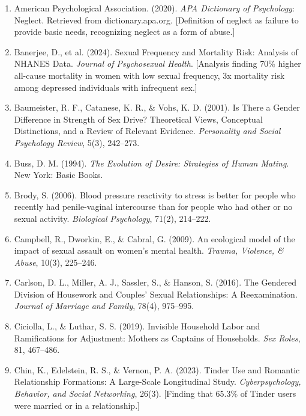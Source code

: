 \documentclass[12pt,openany]{book}
\numberwithin{equation}{chapter}
\begin{document}
\begin{enumerate}
    \item American Psychological Association. (2020). \textit{APA Dictionary of Psychology}: Neglect. Retrieved from dictionary.apa.org. [Definition of neglect as failure to provide basic needs, recognizing neglect as a form of abuse.]
    
    \item Banerjee, D., et al. (2024). Sexual Frequency and Mortality Risk: Analysis of NHANES Data. \textit{Journal of Psychosexual Health}. [Analysis finding 70\% higher all-cause mortality in women with low sexual frequency, 3x mortality risk among depressed individuals with infrequent sex.]
    
    \item Baumeister, R. F., Catanese, K. R., \& Vohs, K. D. (2001). Is There a Gender Difference in Strength of Sex Drive? Theoretical Views, Conceptual Distinctions, and a Review of Relevant Evidence. \textit{Personality and Social Psychology Review}, 5(3), 242--273.
    
    \item Buss, D. M. (1994). \textit{The Evolution of Desire: Strategies of Human Mating}. New York: Basic Books.
    
    \item Brody, S. (2006). Blood pressure reactivity to stress is better for people who recently had penile-vaginal intercourse than for people who had other or no sexual activity. \textit{Biological Psychology}, 71(2), 214--222.
    
    \item Campbell, R., Dworkin, E., \& Cabral, G. (2009). An ecological model of the impact of sexual assault on women's mental health. \textit{Trauma, Violence, \& Abuse}, 10(3), 225--246.
    
    \item Carlson, D. L., Miller, A. J., Sassler, S., \& Hanson, S. (2016). The Gendered Division of Housework and Couples' Sexual Relationships: A Reexamination. \textit{Journal of Marriage and Family}, 78(4), 975--995.
    
    \item Ciciolla, L., \& Luthar, S. S. (2019). Invisible Household Labor and Ramifications for Adjustment: Mothers as Captains of Households. \textit{Sex Roles}, 81, 467--486.
    
    \item Chin, K., Edelstein, R. S., \& Vernon, P. A. (2023). Tinder Use and Romantic Relationship Formations: A Large-Scale Longitudinal Study. \textit{Cyberpsychology, Behavior, and Social Networking}, 26(3). [Finding that 65.3\% of Tinder users were married or in a relationship.]
    

\end{enumerate}
\end{document}
